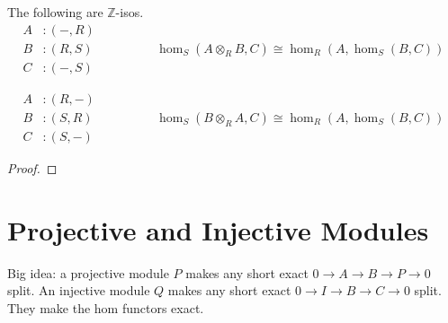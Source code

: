 \documentclass[twoside,10pt]{report}
\begin{document}
\begin{thrm}
	The following are $\mathbb{Z}$-isos.
\begin{equation*}
	\begin{aligned}
		A&:(-,R)\\
		B&:(R,S)\\
		C&:(-,S)
	\end{aligned}
	\qquad\qquad
	\begin{aligned}
		\hom_S(A\otimes_{R}B,C) \cong \hom_R(A,\hom_S(B,C))
	\end{aligned}
\end{equation*}

\vspace{5mm}

\begin{equation*}
	\begin{aligned}
		A&:(R,-)\\
		B&:(S,R)\\
		C&:(S,-)
	\end{aligned}
	\qquad\qquad
	\begin{aligned}
		\hom_S(B\otimes_{R}A,C) \cong \hom_R(A,\hom_S(B,C))
	\end{aligned}
\end{equation*}
\end{thrm}
\begin{proof}
\end{proof}

\section{Projective and Injective Modules}

\begin{note}[]
	Big idea: a projective module $P$ makes any short exact $0\to A \to B \to P \to 0$ split. An injective module $Q$ makes any short exact $0 \to I\to B\to C\to 0$ split. They make the hom functors exact.
\end{note}
\end{document}
